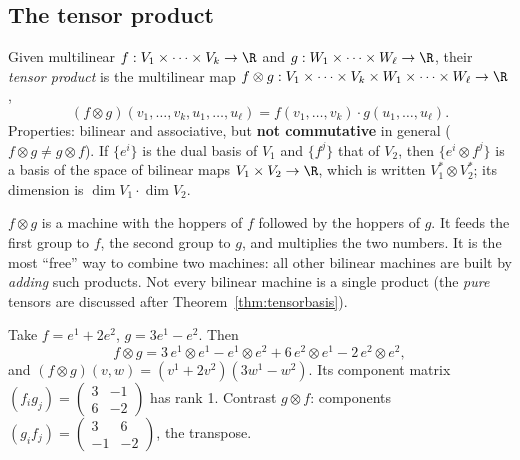 \subsection{The tensor product}\label{sec:tensorproduct}
\begin{formal}
Given multilinear $f:V_1\times\dots\times V_k\to\R$ and $g:W_1\times\dots\times W_\ell\to\R$, their \emph{tensor product} is the multilinear map $f\otimes g:V_1\times\dots\times V_k\times W_1\times\dots\times W_\ell\to\R$,
\[
(f\otimes g)(v_1,\dots,v_k,u_1,\dots,u_\ell)=f(v_1,\dots,v_k)\cdot g(u_1,\dots,u_\ell).
\]
Properties: bilinear and associative, but \textbf{not commutative} in general ($f\otimes g\ne g\otimes f$). If $\{e^{i}\}$ is the dual basis of $V_1$ and $\{f^{j}\}$ that of $V_2$, then $\{e^{i}\otimes f^{j}\}$ is a basis of the space of bilinear maps $V_1\times V_2\to\R$, which is written $V_1^*\otimes V_2^*$; its dimension is $\dim V_1\cdot\dim V_2$.
\end{formal}

\begin{intuition}
$f\otimes g$ is a machine with the hoppers of $f$ followed by the hoppers of $g$. It feeds the first group to $f$, the second group to $g$, and multiplies the two numbers. It is the most ``free'' way to combine two machines: all other bilinear machines are built by \emph{adding} such products. Not every bilinear machine is a single product (the \emph{pure} tensors are discussed after Theorem~\ref{thm:tensorbasis}).
\end{intuition}

\begin{example}
Take $f=e^{1}+2e^{2}$, $g=3e^{1}-e^{2}$. Then
\[
f\otimes g=3\,e^{1}\!\otimes e^{1}-e^{1}\!\otimes e^{2}+6\,e^{2}\!\otimes e^{1}-2\,e^{2}\!\otimes e^{2},
\]
and $(f\otimes g)(v,w)=(v^1+2v^2)(3w^1-w^2)$. Its component matrix $(f_ig_j)=\begin{pmatrix}3&-1\\6&-2\end{pmatrix}$ has rank 1. Contrast $g\otimes f$: components $(g_if_j)=\begin{pmatrix}3&6\\-1&-2\end{pmatrix}$, the transpose.
\end{example}


